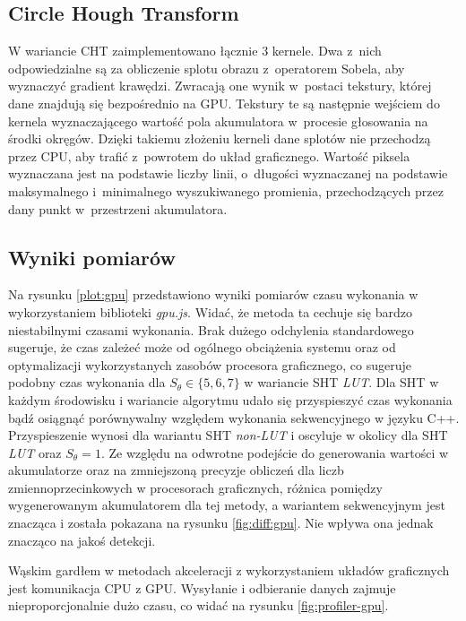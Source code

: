 \subsection{Circle Hough Transform}

W wariancie CHT zaimplementowano łącznie 3 kernele. Dwa z~nich odpowiedzialne są za obliczenie splotu obrazu z~operatorem Sobela, aby wyznaczyć gradient krawędzi. Zwracają one wynik w~postaci tekstury, której dane znajdują się bezpośrednio na GPU. Tekstury te są następnie wejściem do kernela wyznaczającego wartość pola akumulatora w~procesie głosowania na środki okręgów. Dzięki takiemu złożeniu kerneli dane splotów nie przechodzą przez CPU, aby trafić z~powrotem do układ graficznego. Wartość piksela wyznaczana jest na podstawie liczby linii, o~długości wyznaczanej na podstawie maksymalnego i~minimalnego wyszukiwanego promienia, przechodzących przez dany punkt w~przestrzeni akumulatora.

\subsection{Wyniki pomiarów}

Na rysunku \ref{plot:gpu} przedstawiono wyniki pomiarów czasu wykonania w wykorzystaniem biblioteki \textit{gpu.js}. Widać, że metoda ta cechuje się bardzo niestabilnymi czasami wykonania. Brak dużego odchylenia standardowego sugeruje, że czas zależeć może od ogólnego obciążenia systemu oraz od optymalizacji wykorzystanych zasobów procesora graficznego, co sugeruje podobny czas wykonania dla $S_\theta \in \{5,6,7\}$ w wariancie SHT \textit{LUT}. Dla SHT w każdym środowisku i wariancie algorytmu udało się przyspieszyć czas wykonania bądź osiągnąć porównywalny względem wykonania sekwencyjnego w języku C++. Przyspieszenie wynosi  dla wariantu SHT \textit{non-LUT} i oscyluje w okolicy  dla SHT \textit{LUT} oraz $S_\theta = 1$. Ze względu na odwrotne podejście do generowania wartości w akumulatorze oraz na zmniejszoną precyzje obliczeń dla liczb zmiennoprzecinkowych w procesorach graficznych, różnica pomiędzy wygenerowanym akumulatorem dla tej metody, a wariantem sekwencyjnym jest znacząca i została pokazana na rysunku \ref{fig:diff:gpu}. Nie wpływa ona jednak znacząco na jakoś detekcji. 

Wąskim gardłem w metodach akceleracji z wykorzystaniem układów graficznych jest komunikacja CPU z GPU. Wysyłanie i odbieranie danych zajmuje nieproporcjonalnie dużo czasu, co widać na rysunku \ref{fig:profiler-gpu}. 

